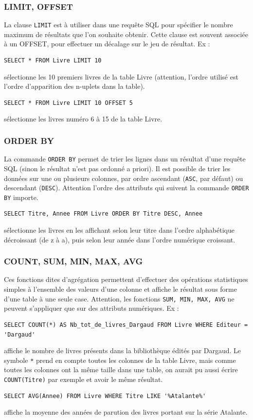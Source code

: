 \documentclass[11pt,a4paper,french,twoside]{PMCours}
\begin{document}
\subsubsection*{LIMIT, OFFSET}

La clause \verb'LIMIT' est à utiliser dans une requête SQL pour spécifier le nombre maximum de résultats que l’on souhaite obtenir. Cette clause est souvent associée à un OFFSET, pour effectuer un décalage sur le jeu de résultat. Ex :
\begin{verbatim}
SELECT * FROM Livre LIMIT 10
\end{verbatim}
sélectionne les 10 premiers livres de la table Livre (attention, l'ordre utilisé est l'ordre d'apparition des n-uplets dans la table).
\begin{verbatim}
SELECT * FROM Livre LIMIT 10 OFFSET 5
\end{verbatim}
sélectionne les livres numéro 6 à 15 de la table Livre.


\subsubsection*{ORDER BY}

La commande \verb'ORDER BY' permet de trier les lignes dans un résultat d’une requête SQL (sinon le résultat n'est pas ordonné a priori). Il est possible de trier les données sur une ou plusieurs colonnes, par ordre ascendant (\verb'ASC', par défaut) ou descendant (\verb'DESC'). Attention l'ordre des attributs qui suivent la commande \verb'ORDER BY' importe.
\begin{verbatim}
SELECT Titre, Annee FROM Livre ORDER BY Titre DESC, Annee
\end{verbatim}
sélectionne les livres en les affichant selon leur titre dans l'ordre alphabétique décroissant (de z à a), puis selon leur année dans l'ordre numérique croissant.


\subsubsection*{COUNT, SUM, MIN, MAX, AVG}

Ces fonctions dites d'agrégation permettent d'effectuer des opérations statistiques simples à l'ensemble des valeurs d'une colonne et affiche le résultat sous forme d'une table à une seule case. Attention, les fonctions \verb'SUM, MIN, MAX, AVG' ne peuvent s'appliquer que sur des attributs numériques. Ex : 
\begin{verbatim}
SELECT COUNT(*) AS Nb_tot_de_livres_Dargaud FROM Livre WHERE Editeur = 'Dargaud'
\end{verbatim}
affiche le nombre de livres présents dans la bibliothèque édités par Dargaud. Le symbole \verb'*' prend en compte toutes les colonnes de la table Livre, mais comme toutes les colonnes ont la même taille dans une table, on aurait pu aussi écrire  \verb'COUNT(Titre)' par exemple et avoir le même résultat.
\begin{verbatim}
SELECT AVG(Annee) FROM Livre WHERE Titre LIKE '%Atalante%'
\end{verbatim}
affiche la moyenne des années de parution des livres portant sur la série Atalante.
\end{document}
